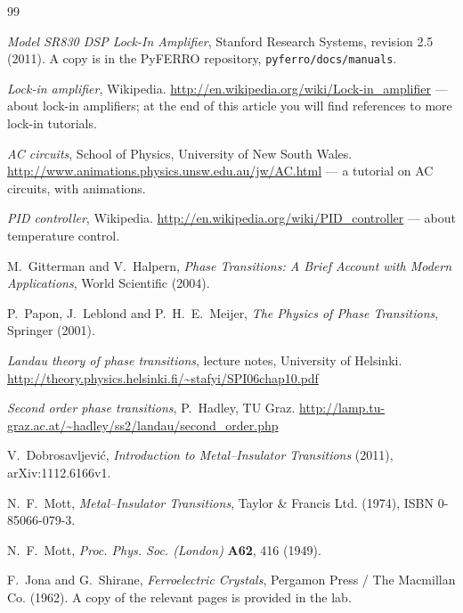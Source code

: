 \documentclass[11pt,a4paper]{article}
\begin{document}
\clearpage
\begin{thebibliography}{99}

  \emph{Model SR830 DSP Lock-In Amplifier}, Stanford Research Systems, revision 2.5
  (2011). A copy is in the PyFERRO repository, \texttt{pyferro/docs/manuals}.

  \emph{Lock-in amplifier}, Wikipedia.
  \url{http://en.wikipedia.org/wiki/Lock-in_amplifier}
  --- about lock-in amplifiers; at the end of this article you will find
  references to more lock-in tutorials.

  \emph{AC circuits}, School of Physics, University of New South Wales.
  \url{http://www.animations.physics.unsw.edu.au/jw/AC.html}
  --- a tutorial on AC circuits, with animations.

  \emph{PID controller}, Wikipedia.
  \url{http://en.wikipedia.org/wiki/PID_controller}
  --- about temperature control.

  M.~Gitterman and V.~Halpern,
  \emph{Phase Transitions: A Brief Account with Modern Applications},
  World Scientific (2004).

  P.~Papon, J.~Leblond and P.~H.~E.~Meijer,
  \emph{The Physics of Phase Transitions}, Springer (2001).

  \emph{Landau theory of phase transitions}, lecture notes, University of
  Helsinki.
  \url{http://theory.physics.helsinki.fi/~stafyi/SPI06chap10.pdf}

  \emph{Second order phase transitions}, P.~Hadley, TU Graz.
  \url{http://lamp.tu-graz.ac.at/~hadley/ss2/landau/second_order.php}

  V.~Dobrosavljevi\'c, \emph{Introduction to Metal--Insulator Transitions}
  (2011), arXiv:1112.6166v1.

  N.~F.~Mott, \emph{Metal--Insulator Transitions},
  Taylor \& Francis Ltd. (1974), ISBN 0-85066-079-3.

  N.~F.~Mott, \emph{Proc. Phys. Soc. (London)} \textbf{A62}, 416 (1949).

  F.~Jona and G.~Shirane, \emph{Ferroelectric Crystals},
  Pergamon Press / The Macmillan Co. (1962).
  A copy of the relevant pages is provided in the lab.


\end{thebibliography}
\end{document}
